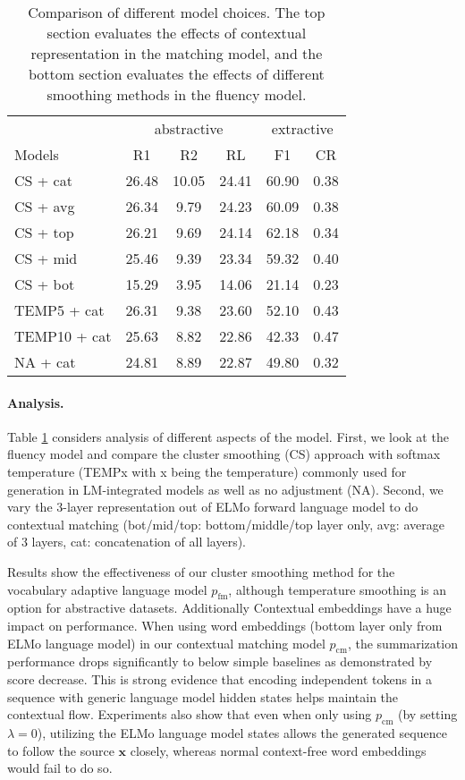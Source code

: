 \documentclass[11pt,a4paper]{article}
\newcommand{\bx}{\mathbf{x}}
\newcommand{\ps}{p_{\mathrm{cm}}}
\newcommand{\pl}{p_{\mathrm{fm}}}
\begin{document}
\begin{table}[t!]
\small
\begin{center}
\begin{tabular}{l ccc cc}
\toprule
 & \multicolumn{3}{c}{abstractive} & \multicolumn{2}{c}{extractive}\\
Models & R1 & R2 & RL & F1 & CR \\ 
\midrule
CS + cat & 26.48 & 10.05 & 24.41 & 60.90 & 0.38\\
CS + avg & 26.34 & 9.79 & 24.23 & 60.09 & 0.38\\
CS + top & 26.21 & 9.69 & 24.14 & 62.18 & 0.34\\
CS + mid & 25.46 & 9.39 & 23.34 & 59.32 & 0.40\\
CS + bot & 15.29 & 3.95 & 14.06 & 21.14 & 0.23\\
\midrule
TEMP5 + cat & 26.31 & 9.38 & 23.60 & 52.10 & 0.43\\
TEMP10 + cat & 25.63 & 8.82 & 22.86 & 42.33 & 0.47\\
NA + cat & 24.81 & 8.89  & 22.87 & 49.80 & 0.32\\
\bottomrule
\end{tabular}
\end{center}
\caption{Comparison of different model choices. The top section evaluates the effects of contextual representation in the matching model, and the bottom section evaluates the effects of different smoothing methods in the fluency model.}
\label{table:analysis}
\end{table}


\paragraph{Analysis.}
Table \ref{table:analysis} considers analysis of different aspects of the model. First, we look at the 
fluency model and compare the cluster smoothing (CS) approach with softmax temperature (TEMPx with x being the temperature) commonly used for generation in LM-integrated models \cite{chorowski2016towards} as well as no adjustment (NA). Second, we vary the 3-layer representation out of ELMo forward language model to do contextual matching (bot/mid/top: bottom/middle/top layer only, avg: average of 3 layers, cat: concatenation of all layers). 

Results show the effectiveness of our cluster smoothing method for the vocabulary adaptive language model $\pl$, although temperature smoothing is an option for abstractive datasets. Additionally Contextual embeddings have a huge impact on performance. 
 When using word embeddings (bottom layer only from ELMo language model) in our contextual matching model $\ps$, the summarization performance drops significantly to below simple baselines as demonstrated by score decrease. This is strong evidence that encoding independent tokens in a sequence with generic language model hidden states helps maintain the contextual flow. 
 Experiments also show that even when only using $\ps$ (by setting $\lambda=0$), utilizing the ELMo language model states allows the generated sequence to follow the source $\bx$ closely, whereas normal context-free word embeddings would fail to do so.
\end{document}
